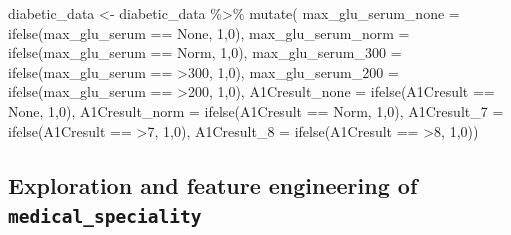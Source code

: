 \documentclass[
]{article}
\newenvironment{Shaded}{\begin{snugshade}}{\end{snugshade}}
\newcommand{\AttributeTok}[1]{\textcolor[rgb]{0.77,0.63,0.00}{#1}}
\newcommand{\DecValTok}[1]{\textcolor[rgb]{0.00,0.00,0.81}{#1}}
\newcommand{\FunctionTok}[1]{\textcolor[rgb]{0.00,0.00,0.00}{#1}}
\newcommand{\NormalTok}[1]{#1}
\newcommand{\OtherTok}[1]{\textcolor[rgb]{0.56,0.35,0.01}{#1}}
\newcommand{\SpecialCharTok}[1]{\textcolor[rgb]{0.00,0.00,0.00}{#1}}
\newcommand{\StringTok}[1]{\textcolor[rgb]{0.31,0.60,0.02}{#1}}
\begin{document}
\begin{Shaded}
\begin{Highlighting}[]
\NormalTok{diabetic\_data }\OtherTok{\textless{}{-}}\NormalTok{ diabetic\_data }\SpecialCharTok{\%\textgreater{}\%}
  \FunctionTok{mutate}\NormalTok{(}
    \AttributeTok{max\_glu\_serum\_none =} \FunctionTok{ifelse}\NormalTok{(max\_glu\_serum }\SpecialCharTok{==} \StringTok{\textquotesingle{}None\textquotesingle{}}\NormalTok{, }\DecValTok{1}\NormalTok{,}\DecValTok{0}\NormalTok{),}
    \AttributeTok{max\_glu\_serum\_norm =} \FunctionTok{ifelse}\NormalTok{(max\_glu\_serum }\SpecialCharTok{==} \StringTok{\textquotesingle{}Norm\textquotesingle{}}\NormalTok{, }\DecValTok{1}\NormalTok{,}\DecValTok{0}\NormalTok{),}
    \AttributeTok{max\_glu\_serum\_300 =} \FunctionTok{ifelse}\NormalTok{(max\_glu\_serum }\SpecialCharTok{==} \StringTok{\textquotesingle{}\textgreater{}300\textquotesingle{}}\NormalTok{, }\DecValTok{1}\NormalTok{,}\DecValTok{0}\NormalTok{),}
    \AttributeTok{max\_glu\_serum\_200 =} \FunctionTok{ifelse}\NormalTok{(max\_glu\_serum }\SpecialCharTok{==} \StringTok{\textquotesingle{}\textgreater{}200\textquotesingle{}}\NormalTok{, }\DecValTok{1}\NormalTok{,}\DecValTok{0}\NormalTok{),}
    \AttributeTok{A1Cresult\_none =} \FunctionTok{ifelse}\NormalTok{(A1Cresult }\SpecialCharTok{==} \StringTok{\textquotesingle{}None\textquotesingle{}}\NormalTok{, }\DecValTok{1}\NormalTok{,}\DecValTok{0}\NormalTok{),}
    \AttributeTok{A1Cresult\_norm =} \FunctionTok{ifelse}\NormalTok{(A1Cresult }\SpecialCharTok{==} \StringTok{\textquotesingle{}Norm\textquotesingle{}}\NormalTok{, }\DecValTok{1}\NormalTok{,}\DecValTok{0}\NormalTok{),}
    \AttributeTok{A1Cresult\_7 =} \FunctionTok{ifelse}\NormalTok{(A1Cresult }\SpecialCharTok{==} \StringTok{\textquotesingle{}\textgreater{}7\textquotesingle{}}\NormalTok{, }\DecValTok{1}\NormalTok{,}\DecValTok{0}\NormalTok{),}
    \AttributeTok{A1Cresult\_8 =} \FunctionTok{ifelse}\NormalTok{(A1Cresult }\SpecialCharTok{==} \StringTok{\textquotesingle{}\textgreater{}8\textquotesingle{}}\NormalTok{, }\DecValTok{1}\NormalTok{,}\DecValTok{0}\NormalTok{))}
\end{Highlighting}
\end{Shaded}

\hypertarget{exploration-and-feature-engineering-of-medical_speciality}{%
\subsection{\texorpdfstring{Exploration and feature engineering of
\texttt{medical\_speciality}}{Exploration and feature engineering of medical\_speciality}}\label{exploration-and-feature-engineering-of-medical_speciality}}
\end{document}
